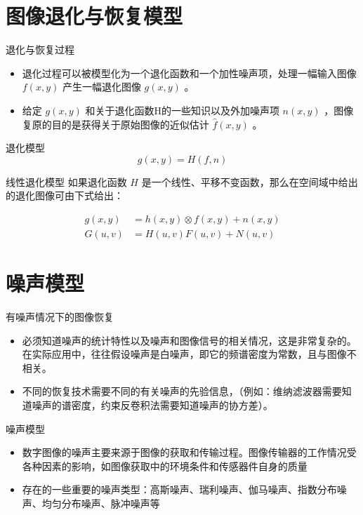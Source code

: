 \documentclass[presentation]{beamer}
\begin{document}
\section{图像退化与恢复模型}
\label{sec:orgaa5187a}
\begin{frame}[label={sec:org6268977}]{退化与恢复过程}
\begin{itemize}
\item 退化过程可以被模型化为一个退化函数和一个加性噪声项，处理一幅输入图像 \(f(x,y)\) 产生一幅退化图像 \(g(x,y)\) 。
\item 给定 \(g(x,y)\) 和关于退化函数H的一些知识以及外加噪声项 \(n(x,y)\) ，图像复原的目的是获得关于原始图像的近似估计 \(\hat f(x,y)\) 。
\end{itemize}
\end{frame}


\begin{frame}[label={sec:org4dc0c3d}]{退化模型}
\[ g(x,y) = H(f,n) \]
\end{frame}


\begin{frame}[label={sec:orge2c9f7e}]{线性退化模型}
如果退化函数 \(H\) 是一个线性、平移不变函数，那么在空间域中给出的退化图像可由下式给出：

\begin{align*}
g(x,y) &= h(x,y)\otimes f(x,y)+n(x,y)\\
G(u,v) &= H(u,v)F(u,v)+N(u,v)
\end{align*}
\end{frame}

\section{噪声模型}
\label{sec:orgb41c6ca}
\begin{frame}[label={sec:org61ef1fa}]{有噪声情况下的图像恢复}
\begin{itemize}
\item 必须知道噪声的统计特性以及噪声和图像信号的相关情况，这是非常复杂的。在实际应用中，往往假设噪声是白噪声，即它的频谱密度为常数，且与图像不相关。
\item 不同的恢复技术需要不同的有关噪声的先验信息，（例如：维纳滤波器需要知道噪声的谱密度，约束反卷积法需要知道噪声的协方差）。
\end{itemize}
\end{frame}

\begin{frame}[label={sec:orgb8656f8}]{噪声模型}
\begin{itemize}
\item 数字图像的噪声主要来源于图像的获取和传输过程。图像传输器的工作情况受各种因素的影响，如图像获取中的环境条件和传感器件自身的质量
\item 存在的一些重要的噪声类型：高斯噪声、瑞利噪声、伽马噪声、指数分布噪声、均匀分布噪声、脉冲噪声等
\end{itemize}
\end{frame}
\end{document}
